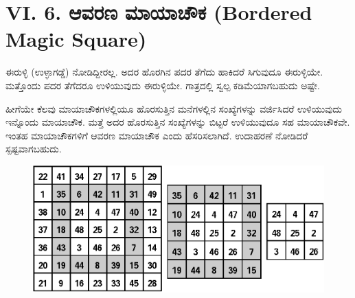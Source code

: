 \section*{VI. 6. ಆವರಣ ಮಾಯಾಚೌಕ (Bordered Magic Square)}

ಈರುಳ್ಳಿ (ಉಳ್ಳಾಗಡ್ಡೆ) ನೋಡಿದ್ದೀರಲ್ಲ. ಅದರ ಹೊರಗಿನ ಪದರ ತೆಗೆದು ಹಾಕಿದರೆ ಸಿಗುವುದೂ ಈರುಳ್ಳಿಯೇ. ಮತ್ತೊಂದು ಪದರ ತೆಗೆದರೂ ಉಳಿಯುವುದು ಈರುಳ್ಳಿಯೇ. ಗಾತ್ರದಲ್ಲಿ ಸ್ವಲ್ಪ ಕಡಿಮೆಯಾಗಬಹುದು ಅಷ್ಟೇ.

ಹೀಗೆಯೇ ಕೆಲವು ಮಾಯಾಚೌಕಗಳಲ್ಲಿಯೂ ಹೊರಸುತ್ತಿನ ಮನೆಗಳಲ್ಲಿನ ಸಂಖ್ಯೆಗಳನ್ನು ವರ್ಜಿಸಿದರೆ ಉಳಿಯುವುದು ಇನ್ನೊಂದು ಮಾಯಾಚೌಕ. ಮತ್ತೆ ಅದರ ಹೊರಸುತ್ತಿನ ಸಂಖ್ಯೆಗಳನ್ನು ಬಿಟ್ಟರೆ ಉಳಿಯುವುದೂ ಸಹ ಮಾಯಾಚೌಕವೇ. ಇಂತಹ ಮಾಯಾಚೌಕಗಳಿಗೆ ಆವರಣ ಮಾಯಾಚೌಕ ಎಂದು ಹೆಸರಿಸಲಾಗಿದೆ. ಉದಾಹರಣೆ ನೋಡಿದರೆ ಸ್ಪಷ್ಟವಾಗಬಹುದು.
\begin{figure}[H]
\includegraphics[scale=.85]{src/figures/chap5/fig5-8.eps}
\end{figure}

